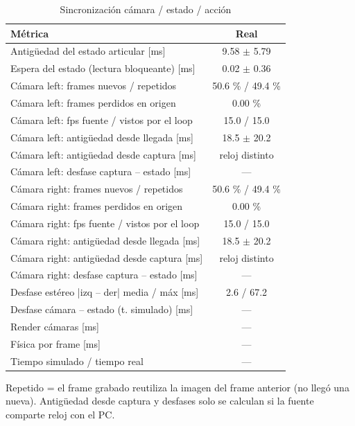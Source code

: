\begin{table}[htbp]
\centering\small
\caption{Sincronización cámara / estado / acción}
\begin{tabular}{lc}
\toprule
Métrica & Real \\
\midrule
Antigüedad del estado articular [ms] & 9.58 $\pm$ 5.79 \\
Espera del estado (lectura bloqueante) [ms] & 0.02 $\pm$ 0.36 \\
Cámara left: frames nuevos / repetidos & 50.6 \% / 49.4 \% \\
Cámara left: frames perdidos en origen & 0.00 \% \\
Cámara left: fps fuente / vistos por el loop & 15.0 / 15.0 \\
Cámara left: antigüedad desde llegada [ms] & 18.5 $\pm$ 20.2 \\
Cámara left: antigüedad desde captura [ms] & reloj distinto \\
Cámara left: desfase captura -- estado [ms] & — \\
Cámara right: frames nuevos / repetidos & 50.6 \% / 49.4 \% \\
Cámara right: frames perdidos en origen & 0.00 \% \\
Cámara right: fps fuente / vistos por el loop & 15.0 / 15.0 \\
Cámara right: antigüedad desde llegada [ms] & 18.5 $\pm$ 20.2 \\
Cámara right: antigüedad desde captura [ms] & reloj distinto \\
Cámara right: desfase captura -- estado [ms] & — \\
Desfase estéreo |izq -- der| media / máx [ms] & 2.6 / 67.2 \\
Desfase cámara -- estado (t. simulado) [ms] & — \\
Render cámaras [ms] & — \\
Física por frame [ms] & — \\
Tiempo simulado / tiempo real & — \\
\bottomrule
\end{tabular}
\par\footnotesize Repetido = el frame grabado reutiliza la imagen del frame anterior (no llegó una nueva). Antigüedad desde captura y desfases solo se calculan si la fuente comparte reloj con el PC.
\end{table}

